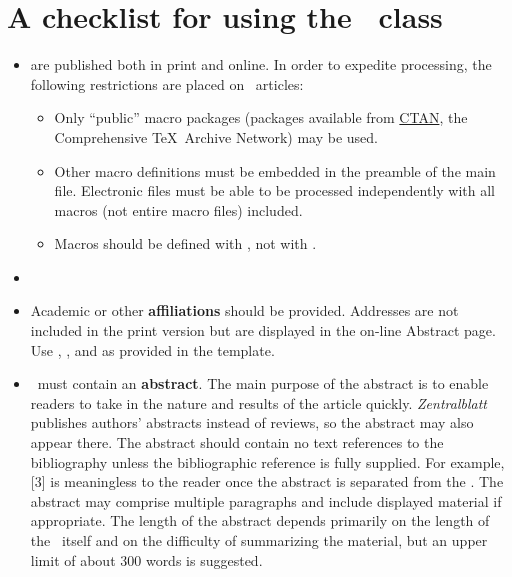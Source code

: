 
\enlargethispage{1\baselineskip}

\section{A checklist for using the \Memos\ class}\label{sec:scheck}

\begin{itemize}

\item \Memos{}
are published both in print and online.  In order to expedite
processing, the following restrictions are placed on
\Memos\ articles:

\begin{itemize}
\item Only ``public'' macro packages (packages available from
  \href{http://www.ctan.org/search.html}{CTAN}, the Comprehensive
  \TeX\ Archive Network) may be used.
\item Other macro definitions must be embedded in the preamble of
  the main file.  Electronic files must
  be able to be processed
  independently with all macros (not entire macro files) included.
\item Macros should be defined with , not with .
\end{itemize}

\item \the\AddHyperref
 
 \item Academic or other \textbf{affiliations} should be provided.
 Addresses are not included in the print version but are displayed
 in the on-line Abstract page.  Use , ,
 and  as provided in the template.
 
\item \Memos\ must contain an \textbf{abstract}.
 The main purpose of the abstract is to enable readers to take in
 the nature and results of the article quickly.  \textit{Zentralblatt}
 publishes authors' abstracts instead of reviews, so the abstract may also
 appear there.  The abstract should contain no text references to the
 bibliography unless the bibliographic reference is fully supplied. For
 example, [3] is meaningless to the reader once the abstract is separated
 from the \Memo. The abstract may comprise multiple paragraphs
 and include displayed material if appropriate. The length of the abstract
 depends primarily on the length of the \Memo\ itself and on the
 difficulty of summarizing the material, but an upper limit of about
 300 words is suggested.


\end{itemize}

